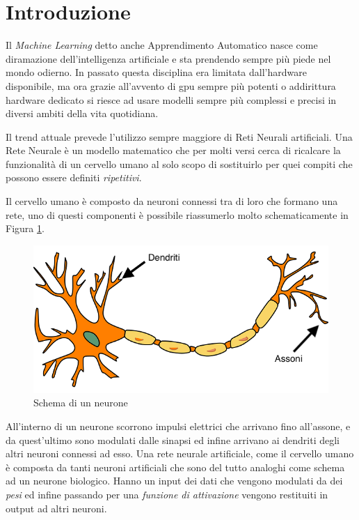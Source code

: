 \chapter*{Introduzione}
Il \textit{Machine Learning} detto anche Apprendimento Automatico nasce come diramazione dell'intelligenza artificiale e sta prendendo sempre più piede nel mondo odierno.  
In passato questa disciplina era limitata dall'hardware disponibile, ma ora grazie all'avvento di \ac{gpu} sempre più potenti o addirittura hardware dedicato
si riesce ad usare modelli sempre più complessi e precisi in diversi ambiti della vita quotidiana. 

Il trend attuale prevede l'utilizzo sempre maggiore di Reti Neurali artificiali. Una Rete Neurale è un modello matematico che per molti versi cerca di ricalcare la funzionalità 
di un cervello umano al solo scopo di sostituirlo per quei compiti che possono essere definiti \textit{ripetitivi}. 

Il cervello umano è composto da neuroni connessi tra di loro che formano una rete, uno di questi componenti è possibile riassumerlo molto schematicamente in Figura \ref{fig:neurone}. 
\begin{figure}[]
    \centering
    \includegraphics[width = \textwidth]{images/neurone.png}
    \caption{Schema di un neurone}
    \label{fig:neurone}
\end{figure}
All'interno di un neurone scorrono impulsi elettrici che arrivano fino all'assone, e da quest'ultimo sono modulati dalle sinapsi ed infine 
arrivano ai dendriti degli altri neuroni connessi ad esso. 
Una rete neurale artificiale, come il cervello umano è composta da tanti neuroni artificiali che sono del tutto analoghi come schema ad un neurone biologico. Hanno un input dei dati che vengono 
modulati da dei \textit{pesi} ed infine passando per una \textit{funzione di attivazione} vengono restituiti in output ad altri neuroni. 

